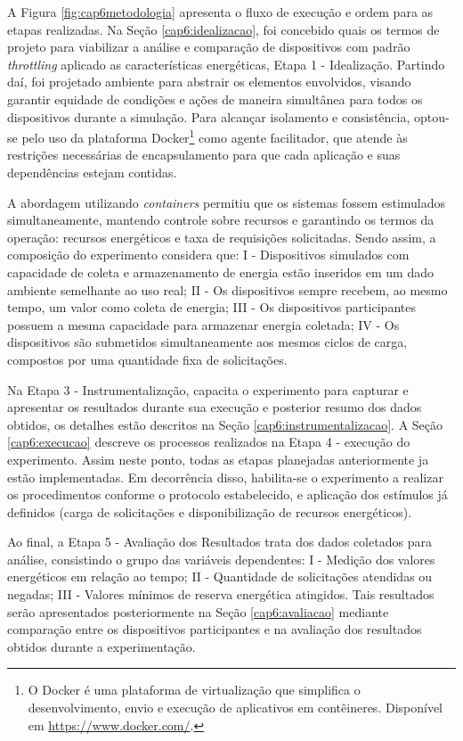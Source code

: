A Figura \ref{fig:cap6metodologia} apresenta o fluxo de execução e ordem para as etapas realizadas. Na Seção \ref{cap6:idealizacao}, foi concebido quais os termos de projeto para viabilizar a análise e comparação de dispositivos com padrão \textit{throttling} aplicado as características energéticas, Etapa 1 - Idealização. Partindo daí, foi projetado ambiente para abstrair os elementos envolvidos, visando garantir equidade de condições e ações de maneira simultânea para todos os dispositivos durante a simulação. Para alcançar isolamento e consistência, optou-se pelo uso da plataforma Docker\footnote{O Docker é uma plataforma de virtualização que simplifica o desenvolvimento, envio e execução de aplicativos em contêineres. Disponível em \url{https://www.docker.com/}.} como agente facilitador, que atende às restrições necessárias de encapsulamento para que cada aplicação e suas dependências estejam contidas. 

A abordagem utilizando  \textit{containers} permitiu que os sistemas fossem estimulados simultaneamente, mantendo controle sobre recursos e garantindo os termos da operação: recursos energéticos e taxa de requisições solicitadas. Sendo assim, a composição do experimento considera que:  I - Dispositivos simulados com capacidade de coleta e armazenamento de energia estão inseridos em um dado ambiente semelhante ao uso real; II - Os dispositivos sempre recebem, ao mesmo tempo, um valor como coleta de energia; III - Os dispositivos participantes possuem a mesma capacidade para armazenar energia coletada; IV - Os dispositivos são submetidos simultaneamente aos mesmos ciclos de carga, compostos por uma quantidade fixa de solicitações.

Na Etapa 3 - Instrumentalização, capacita o experimento para capturar e apresentar os resultados durante sua execução e posterior resumo dos dados obtidos, os detalhes estão descritos na Seção \ref{cap6:instrumentalizacao}. A Seção \ref{cap6:execucao} descreve os processos realizados na Etapa 4 - execução do experimento. Assim neste ponto, todas as etapas planejadas anteriormente ja estão implementadas. Em decorrência disso, habilita-se o experimento a realizar os procedimentos conforme o protocolo estabelecido, e aplicação dos estímulos já definidos (carga de solicitações e disponibilização de recursos energéticos).

Ao final, a Etapa 5 - Avaliação dos Resultados trata dos dados coletados para análise,
consistindo o grupo das variáveis dependentes: I - Medição dos valores energéticos em relação ao tempo; II - Quantidade de solicitações atendidas ou negadas; III - Valores mínimos de reserva energética atingidos. Tais resultados serão apresentados posteriormente na Seção \ref{cap6:avaliacao} mediante comparação entre os dispositivos participantes e na avaliação dos resultados obtidos durante a experimentação.

